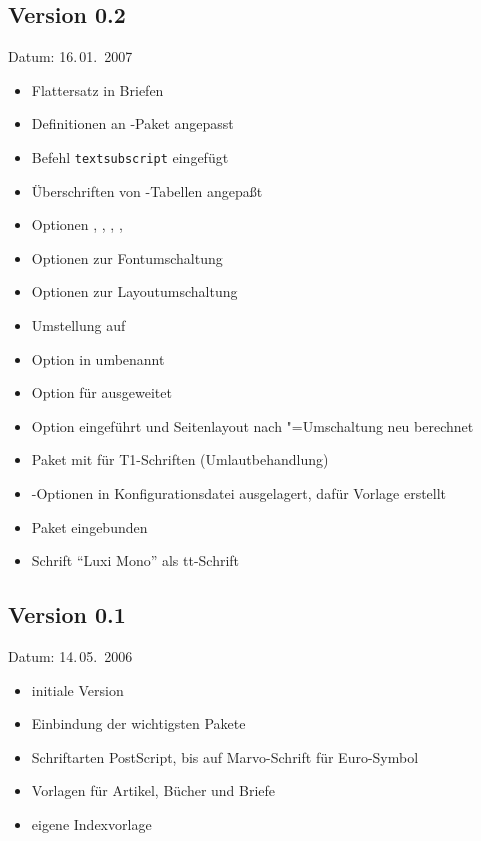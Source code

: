 \subsection{Version 0.2}

Datum: 16.\,01.~2007

\begin{itemize}
	\item Flattersatz in Briefen
	\item Definitionen an -Paket angepasst
	\item Befehl \texttt{textsubscript} eingefügt
	\item Überschriften von -Tabellen angepaßt
	\item Optionen , , , , 
	\item Optionen  zur Fontumschaltung
	\item Optionen  zur Layoutumschaltung
	\item Umstellung auf 
	\item Option  in  umbenannt
	\item Option  für  ausgeweitet
	\item Option  eingeführt und Seitenlayout nach "=Umschaltung neu berechnet
	\item Paket  mit  für T1-Schriften (Umlautbehandlung)
	\item {}-Optionen in Konfigurationsdatei ausgelagert, dafür Vorlage erstellt
	\item Paket  eingebunden
	\item Schrift "`Luxi Mono"' als tt-Schrift
\end{itemize}

\subsection{Version 0.1}

Datum: 14.\,05.~2006

\begin{itemize}
	\item initiale Version
	\item Einbindung der wichtigsten Pakete
	\item Schriftarten PostScript, bis auf Marvo-Schrift für Euro-Symbol
	\item Vorlagen für Artikel, Bücher und Briefe
	\item eigene Indexvorlage
\end{itemize}



